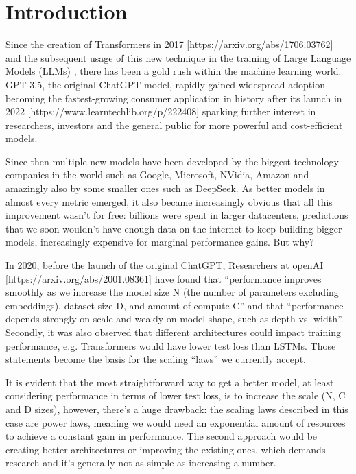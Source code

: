\section{Introduction}

Since the creation of Transformers in 2017 [https://arxiv.org/abs/1706.03762] and the subsequent usage of this new technique in the training of Large Language Models (LLMs) , there has been a gold rush within the machine learning world. GPT-3.5, the original ChatGPT model, rapidly gained widespread adoption becoming the fastest-growing consumer application in history after its launch in 2022 [https://www.learntechlib.org/p/222408] sparking further interest in researchers, investors and the general public for more powerful and cost-efficient models. 

Since then multiple new models have been developed by the biggest technology companies in the world such as Google, Microsoft, NVidia, Amazon and amazingly also by some smaller ones such as DeepSeek. As better models in almost every metric emerged, it also became increasingly obvious that all this improvement wasn’t for free: billions were spent in larger datacenters, predictions that we soon wouldn’t have enough data on the internet to keep building bigger models, increasingly expensive for marginal performance gains. But why?

In 2020, before the launch of the original ChatGPT, Researchers at openAI [https://arxiv.org/abs/2001.08361] have found that “performance improves smoothly as we increase the model size N (the number of parameters excluding embeddings), dataset size D, and amount of compute C” and that “performance depends strongly on scale and weakly on model shape, such as depth vs. width”. Secondly, it was also observed that different architectures could impact training performance, e.g. Transformers would have lower test loss than LSTMs. Those statements become the basis for the scaling “laws” we currently accept.

It is evident that the most straightforward way to get a better model, at least considering performance in terms of lower test loss, is to increase the scale (N, C and D sizes), however, there’s a huge drawback: the scaling laws described in this case are power laws, meaning we would need an exponential amount of resources to achieve a constant gain in performance. The second approach would be creating better architectures or improving the existing ones, which demands research and it’s generally not as simple as increasing a number.


